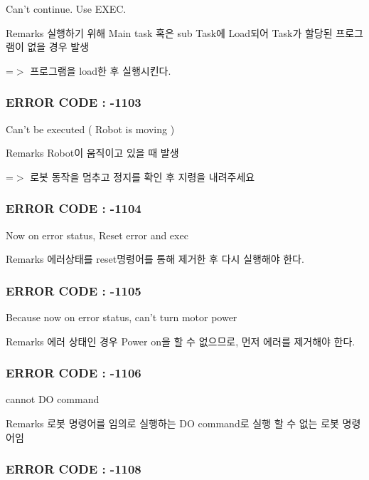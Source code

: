 Can't continue. Use E\-X\-E\-C. \begin{DoxyRemark}{Remarks}
실행하기 위해 Main task 혹은 sub Task에 Load되어 Task가 할당된 프로그램이 없을 경우 발생 \par
 =$>$ 프로그램을 load한 후 실행시킨다.
\end{DoxyRemark}


 \subsubsection*{E\-R\-R\-O\-R C\-O\-D\-E \-: -\/1103 }

Can't be executed ( Robot is moving ) \begin{DoxyRemark}{Remarks}
Robot이 움직이고 있을 때 발생 \par
 =$>$ 로봇 동작을 멈추고 정지를 확인 후 지령을 내려주세요
\end{DoxyRemark}


 \subsubsection*{E\-R\-R\-O\-R C\-O\-D\-E \-: -\/1104 }

Now on error status, Reset error and exec \begin{DoxyRemark}{Remarks}
에러상태를 reset명령어를 통해 제거한 후 다시 실행해야 한다.
\end{DoxyRemark}


 \subsubsection*{E\-R\-R\-O\-R C\-O\-D\-E \-: -\/1105 }

Because now on error status, can't turn motor power \begin{DoxyRemark}{Remarks}
에러 상태인 경우 Power on을 할 수 없으므로, 먼저 에러를 제거해야 한다.
\end{DoxyRemark}


 \subsubsection*{E\-R\-R\-O\-R C\-O\-D\-E \-: -\/1106 }

cannot D\-O command \begin{DoxyRemark}{Remarks}
로봇 명령어를 임의로 실행하는 D\-O command로 실행 할 수 없는 로봇 명령어임
\end{DoxyRemark}


 \subsubsection*{E\-R\-R\-O\-R C\-O\-D\-E \-: -\/1108 }


